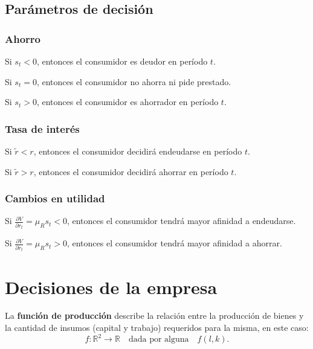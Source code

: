 \documentclass[8pt,a4paper]{extarticle}
\begin{document}
\begin{multicols}{3}
\subsection{Parámetros de decisión}

\subsubsection*{Ahorro}

\begin{eqlist}
\item Si $s_t < 0$, entonces el consumidor es deudor en período $t$.
\item Si $s_t = 0$, entonces el consumidor no ahorra ni pide prestado.
\item Si $s_t > 0$, entonces el consumidor es ahorrador en período $t$.
\end{eqlist}

\subsubsection*{Tasa de interés}

\begin{eqlist}
\item Si $ \tilde{r} < r $, entonces el consumidor decidirá endeudarse en período $t$.
\item Si $ \tilde{r} > r $, entonces el consumidor decidirá ahorrar en período $t$.
\end{eqlist}

\subsubsection*{Cambios en utilidad}

\begin{eqlist}
\item Si $\displaystyle \frac{\partial V}{\partial r_t} = \mu_R s_t < 0$, entonces el consumidor tendrá mayor afinidad a endeudarse.
\item Si $\displaystyle \frac{\partial V}{\partial r_t} = \mu_R s_t > 0$, entonces el consumidor tendrá mayor afinidad a ahorrar.
\end{eqlist}

\newpage

\section{Decisiones de la empresa}

\begin{boxdef}
	La \textbf{función de producción} describe la relación entre la producción de bienes y la cantidad de insumos (capital y trabajo) requeridos para la misma, en este caso:
	\[
		f: \mathbb{R}^2 \to \mathbb{R} \quad \text{dada por alguna} \quad f(l, k)
	.\] 
\end{boxdef}


\end{multicols}
\end{document}
